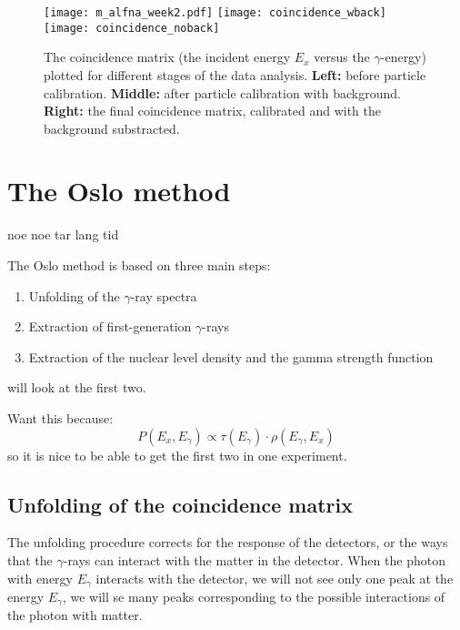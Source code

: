 \documentclass[11pt,a4wide]{article}
\begin{document}
\begin{figure}[htp]
\centering
\texttt{[image: m\_alfna\_week2.pdf]}
\texttt{[image: coincidence\_wback]}
\texttt{[image: coincidence\_noback]}
\caption{The coincidence matrix (the incident energy $E_x$ versus the $\gamma$-energy) plotted for different stages of the data analysis. \textbf{Left:} before particle calibration. \textbf{Middle:} after particle calibration with background. \textbf{Right:} the final coincidence matrix, calibrated and with the background substracted.}
\label{fig: coincidence}
\end{figure}



\section{The Oslo method}
noe noe tar lang tid

The Oslo method is based on three main steps:
\begin{enumerate}
\item Unfolding of the $\gamma$-ray spectra
\item Extraction of first-generation $\gamma$-rays
\item Extraction of the nuclear level density and the gamma strength function
\end{enumerate}

will look at the first two. 

Want this because:
\[
P(E_x,E_\gamma) \propto \tau(E_\gamma)\cdot \rho(E_\gamma, E_x)
\]
so it is nice to be able to get the first two in one experiment.


\subsection{Unfolding of the coincidence matrix}
The unfolding procedure corrects for the response of the detectors, or the ways that the $\gamma$-rays can interact with the matter in the detector. When the photon with energy $E_\gamma$ interacts with the detector, we will not see only one peak at the energy $E_\gamma$, we will se many peaks corresponding to the possible interactions of the photon with matter. 
\end{document}
